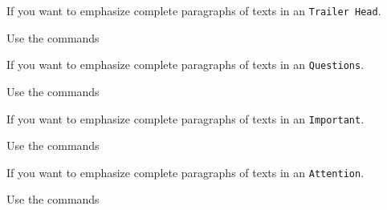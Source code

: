 \documentclass[graybox,square]{svmono}
\begin{document}
\begin{sloppy}
\cprotect{}

If you want to emphasize complete paragraphs of texts in an \verb|Trailer Head|.  


Use the commands

\cprotect{}

If you want to emphasize complete paragraphs of texts in an \verb|Questions|.  

Use the commands

\cprotect{}

If you want to emphasize complete paragraphs of texts in an \verb|Important|.  

Use the commands

\cprotect{}

If you want to emphasize complete paragraphs of texts in an \verb|Attention|.  

Use the commands

\cprotect{}


\end{sloppy}
\end{document}
